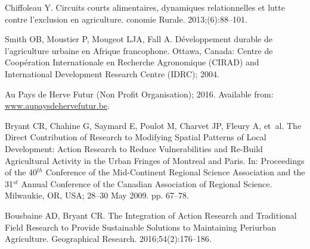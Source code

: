 \documentclass[10pt,a4paper]{article}
\begin{document}
\begin{multicols}{2}
\begin{thebibliography}{10}
Chiffoleau Y.
\newblock Circuits courts alimentaires, dynamiques relationnelles et lutte
  contre l'exclusion en agriculture.
conomie Rurale. 2013;(6):88--101.

Smith OB, Moustier P, Mougeot LJA, Fall A.
\newblock D{\'e}veloppement durable de l’agriculture urbaine en Afrique
  francophone.
\newblock Ottawa, Canada: Centre de Coopération Internationale en Recherche
  Agronomique (CIRAD) and International Development Research Centre (IDRC);
  2004.

Au Pays de Herve Futur (Non Profit Organisation); 2016.
\newblock Available from: \url{www.aupaysdehervefutur.be}.

Bryant CR, Chahine G, Saymard E, Poulot M, Charvet JP, Fleury A, et~al.
\newblock The Direct Contribution of Research to Modifying Spatial Patterns of
  Local Development: Action Research to Reduce Vulnerabilities and Re-Build
  Agricultural Activity in the Urban Fringes of Montreal and Paris.
\newblock In: Proceedings of the 40$^{th}$ Conference of the Mid-Continent
  Regional Science Association and the 31$^{st}$ Annual Conference of the
  Canadian Association of Regional Science. Milwaukie, OR, USA; 28--30 May
  2009. pp. 67--78.

Bousbaine AD, Bryant CR.
\newblock The Integration of Action Research and Traditional Field Research to
  Provide Sustainable Solutions to Maintaining Periurban Agriculture.
\newblock Geographical Research. 2016;54(2):176--186.

\end{thebibliography}


\end{multicols}
\end{document}
